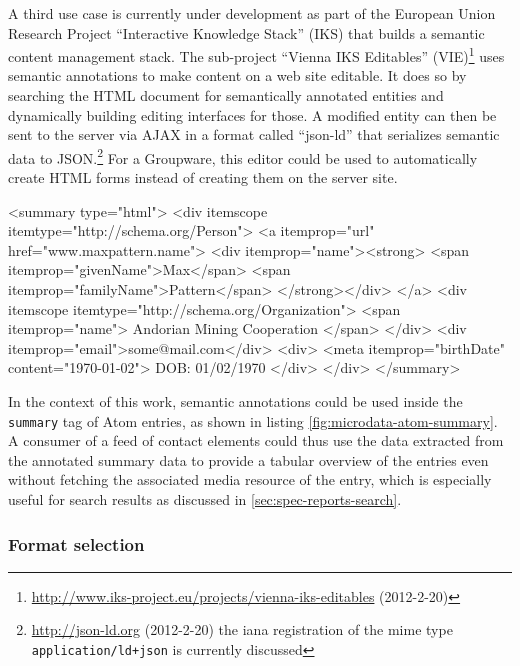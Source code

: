 \documentclass[12pt,a4paper,twoside]{scrartcl}		%
\newcommand{\citeurl}[2]{\url{#1} (#2)}
\begin{document}
A third use case is currently under development as part of the European Union
Research Project ``Interactive Knowledge Stack'' (IKS) that builds a semantic
content management stack. The sub-project ``Vienna IKS Editables''
(VIE)\footnote{\citeurl{http://www.iks-project.eu/projects/vienna-iks-editables}{2012-2-20}}
uses semantic annotations to make content on a web site editable. It does so by
searching the HTML document for semantically annotated entities and dynamically
building editing interfaces for those. A modified entity can then be sent to the
server via AJAX in a format called ``json-ld'' that serializes semantic data to
JSON.\footnote{\citeurl{http://json-ld.org}{2012-2-20} the iana registration of
  the mime type \lstinline:application/ld+json: is currently discussed}
For a Groupware, this editor could be used to automatically create HTML forms instead
of creating them on the server site.

\begin{anylisting}[label=fig:microdata-atom-summary,
                   language=xml,
                   caption={Microdata used in the summary of an ATOM entry summary (markup not escaped for clarity)}]
<summary type="html">
  <div itemscope itemtype="http://schema.org/Person">
    <a itemprop="url" href="www.maxpattern.name">
      <div itemprop="name"><strong>
        <span itemprop="givenName">Max</span>
        <span itemprop="familyName">Pattern</span>
      </strong></div>
    </a>
    <div itemscope
         itemtype="http://schema.org/Organization">
      <span itemprop="name">
        Andorian Mining Cooperation
      </span>
    </div>
    <div itemprop="email">some@mail.com</div>
    <div>
      <meta itemprop="birthDate" content="1970-01-02">
      DOB: 01/02/1970
    </div>
  </div>
</summary>  
\end{anylisting}

In the context of this work, semantic annotations could be used inside the
\lstinline:summary: tag of Atom entries, as shown in listing
\ref{fig:microdata-atom-summary}. A consumer of a feed of contact elements could
thus use the data extracted from the annotated summary data to provide a tabular
overview of the entries even without fetching the associated media resource of
the entry, which is especially useful for search results as discussed in
\autoref{sec:spec-reports-search}.

\subsubsection{Format selection}
\end{document}
